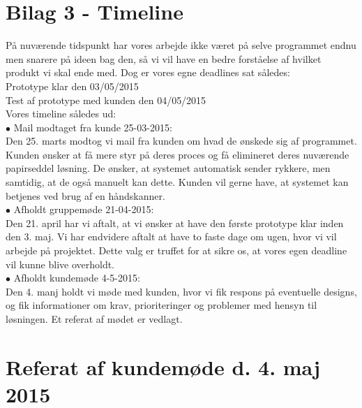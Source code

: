 \documentclass[a4paper]{article}
\begin{document}
\section{Bilag 3 - Timeline}
På nuværende tidspunkt har vores arbejde ikke været på selve programmet endnu men snarere på ideen bag den, så vi vil have en bedre forståelse af hvilket produkt vi skal ende med. Dog er vores egne deadlines sat således:\\
Prototype klar den 03/05/2015 \\
Test af prototype med kunden den 04/05/2015\\
Vores timeline således ud:\\
$\bullet$ Mail modtaget fra kunde 25-03-2015:\\
Den 25. marts modtog vi mail fra kunden om hvad de ønskede sig af programmet. Kunden ønsker at få mere styr på deres proces og få elimineret deres nuværende papirseddel løsning. De ønsker, at systemet automatisk sender rykkere, men samtidig, at de også manuelt kan dette. Kunden vil gerne have, at systemet kan betjenes ved brug af en håndskanner.\\
$\bullet$ Afholdt gruppemøde 21-04-2015:\\
Den 21. april har vi aftalt, at vi ønsker at have den første prototype klar inden den 3. maj. Vi har endvidere aftalt at have to faste dage om ugen, hvor vi vil arbejde på projektet. Dette valg er truffet for at sikre os, at vores egen deadline vil kunne blive overholdt.\\
$\bullet$ Afholdt kundemøde 4-5-2015:\\
Den 4. manj holdt vi møde med kunden, hvor vi fik respons på eventuelle designs, og fik informationer om krav, prioriteringer og problemer med hensyn til løsningen. Et referat af mødet er vedlagt.
\pagebreak
\section{Referat af kundemøde d. 4. maj 2015}
\end{document}
